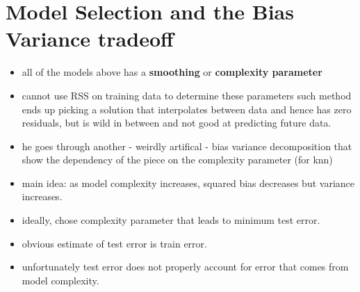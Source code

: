 \documentclass[a4paper]{report}
\newcommand{\<}{\textless}
\renewcommand{\>}{\textgreater}
\begin{document}
\section{Model Selection and the Bias Variance tradeoff}
\begin{itemize}
  \item all of the models above has a {\bf smoothing} or {\bf complexity parameter}
  \item cannot use RSS on training data to determine these parameters
    \subitem such method ends up picking a solution that interpolates between data and hence has zero residuals, but is wild in between and not good at predicting future data.
  \item he goes through another - weirdly artifical - bias variance decomposition that show the dependency of the piece on the complexity parameter (for knn)
  \item main idea: as model complexity increases, squared bias decreases but variance increases.
  \item ideally, chose complexity parameter that leads to minimum test error.
  \item obvious estimate of test error is train error. 
  \item unfortunately test error does not properly account for error that comes from model complexity.
\end{itemize}
\end{document}
